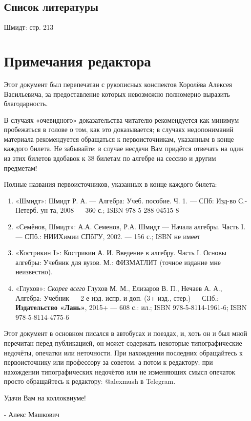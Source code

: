 \documentclass{article}
\begin{document}
\subsection*{Список литературы}
Шмидт: стр. 213


\newpage
\section{Примечания редактора}
Этот документ был перепечатан с рукописных конспектов Королёва Алексея Васильевича, за предоставление которых невозможно полномерно выразить благодарность.

В случаях «очевидного» доказательства читателю рекомендуется как минимум пробежаться в голове о том, как это доказывается; в случаях недопониманий материала рекомендуется обращаться к первоисточникам, указанным в конце каждого билета. Не забывайте: в случае несдачи Вам придётся отвечать на один из этих билетов вдобавок к 38 билетам по алгебре на сессию и другим предметам!

Полные названия первоисточников, указанных в конце каждого билета:
\begin{enumerate}
\item «Шмидт»: Шмидт Р. А. --- Алгебра: Учеб. пособие. Ч. 1. --- СПб: Изд-во С.-Петерб. ун-та, 2008 --- 360 с.; ISBN 978-5-288-04515-8
\item «Семёнов, Шмидт»: А.А. Семенов, Р.А. Шмидт --- Начала алгебры. Часть I. --- СПб.: НИИХимии СПбГУ, 2002. --- 156 с.; ISBN не имеет
\item «Кострикин I»: Кострикин А. И. Введение в алгебру. Часть I. Основы алгебры: Учебник для вузов. М.: ФИЗМАТЛИТ (точное издание мне неизвестно).
\item «Глухов»: \textit{Скорее всего} Глухов М. М., Елизаров В. П., Нечаев А. А., Алгебра: Учебник --- 2-е изд. испр. и доп. (3+ изд., стер.) --- СПб.: \textbf{Издательство «Лань»}, 2015+ --- 608 с.: ил.; ISBN 978-5-8114-1961-6; ISBN 978-5-8114-4775-6
\end{enumerate}

Этот документ в основном писался в автобусах и поездах, и, хоть он и был мной перечитан перед публикацией, он может содержать некоторые типографические недочёты, опечатки или неточности. При нахождении последних обращайтесь к первоисточнику или профессору за советом, а потом к редактору; при нахождении типографических недочётов или не изменяющих смысл опечаток просто обращайтесь к редактору: @alexmush в Telegram.

Удачи Вам на коллоквиуме!

\hspace*{\fill} - Алекс Машкович
\end{document}
